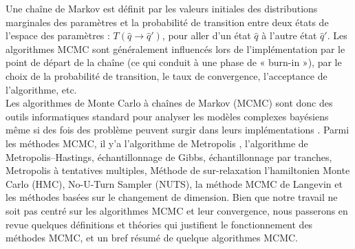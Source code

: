 Une chaîne de Markov est définit par les valeurs initiales des distributions marginales des paramètres et la probabilité de transition entre deux états de l’espace des paramètres : \(\displaystyle T(\widehat{q} \rightarrow \widehat{q}\prime) \), pour aller d’un état \(\displaystyle \widehat{q} \) à l’autre état \(\displaystyle \widehat{q}\prime \). Les algorithmes MCMC sont généralement influencés lors de l’implémentation par le point de départ de la chaîne (ce qui conduit à une phase de « burn-in »), par le choix de la probabilité de transition, le taux de convergence, l’acceptance de l’algorithme, etc. \\

Les algorithmes de Monte Carlo à chaînes de Markov (MCMC) sont donc des outils informatiques standard pour analyser les modèles complexes bayésiens \cite{gelfand1990sampling} même si des fois des problème peuvent surgir dans leurs implémentations \cite{robert2020markov}. Parmi les méthodes MCMC, il y’a l’algorithme de Metropolis , l’algorithme de Metropolis–Hastings, échantillonnage de Gibbs, échantillonnage par tranches, Metropolis à tentatives multiples, Méthode de sur-relaxation l'hamiltonien Monte Carlo (HMC), No-U-Turn Sampler (NUTS), la méthode MCMC de Langevin et les méthodes basées sur le changement de dimension. Bien que notre travail ne soit pas centré sur les algorithmes MCMC et leur convergence, nous passerons en revue quelques définitions et théories qui justifient le fonctionnement des méthodes MCMC, et un bref résumé de quelque algorithmes MCMC. \\
